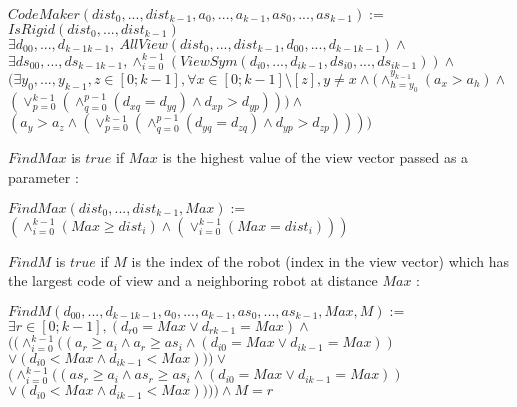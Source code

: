 \documentclass{article}
\begin{document}
\begin{center}

$CodeMaker(dist_{0}, ...,dist_{k-1}, a_{0}, ..., a_{k-1}, as_{0}, ..., as_{k-1}):=$\\
$IsRigid(dist_{0}, ...,dist_{k-1})$\\
$\exists d_{00}, ...,d_{k-1k-1},\ AllView(dist_{0}, ...,dist_{k-1}, d_{00}, ...,d_{k-1k-1})\land$\\
$\exists ds_{00}, ...,ds_{k-1k-1}, \land_{i=0}^{k-1} (ViewSym(d_{i0}, ..., d_{ik-1}, ds_{i0}, ..., ds_{ik-1}))\land$\\
$(\exists y_{0}, ..., y_{k-1},z \in [0;k-1], \forall x \in [0;k-1] \setminus [z], y\not=x \land
(\land_{h=y_{0}}^{y_{k-1}}(a_{x} > a_{h}) \land $\\
$(\lor_{p=0}^{k-1}(\land_{q=0}^{p-1}(d_{xq} = d_{yq}) \land d_{xp} > d_{yp} ) ) )\land $\\
$(a_{y} > a_{z} \land (\lor_{p=0}^{k-1}(\land_{q=0}^{p-1}(d_{yq} = d_{zq}) \land d_{yp} > d_{zp} ) ))
)$\\
\end{center}

$FindMax$ is $true$ if $Max$ is the highest value of the view vector passed as a parameter :

\begin{center}

$FindMax(dist_{0}, ...,dist_{k-1}, Max):=$\\
$(\land_{i=0}^{k-1} (Max \geq dist_{i}) \land (\lor_{i=0}^{k-1} (Max = dist_{i})))$
\end{center}

$FindM$ is $true$ if $M$ is the index of the robot (index in the view vector) which has the largest code of view and a neighboring robot at distance $Max$ :

\begin{center}

$FindM(d_{00}, ...,d_{k-1k-1}, a_{0}, ..., a_{k-1}, as_{0}, ..., as_{k-1}, Max, M):=$\\
$\exists r \in [0; k-1], (d_{r0} = Max \lor d_{rk-1} = Max) \land $\\
$((\land_{i=0}^{k-1} ((a_{r} \geq a_i \land a_{r} \geq as_i \land (d_{i0} = Max \lor d_{ik-1} = Max))$\\
$\lor (d_{i0} < Max \land d_{ik-1} < Max))) \lor$\\
$(\land_{i=0}^{k-1} ((as_{r} \geq a_i \land as_{r} \geq as_i \land (d_{i0} = Max \lor d_{ik-1} = Max))$\\
$\lor (d_{i0} < Max \land d_{ik-1} < Max)))) \land M = r $
\end{center}
\end{document}
